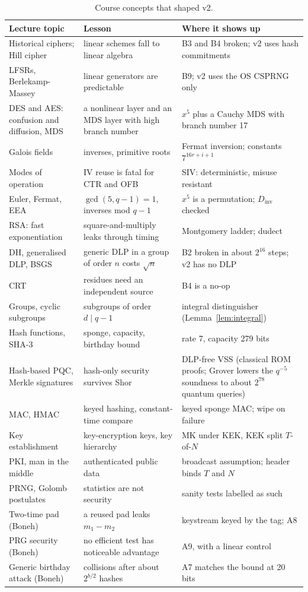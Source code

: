 \documentclass[10pt,a4paper]{article}
\theoremstyle{definition}
\theoremstyle{remark}
\begin{document}
\begin{table}[t]
\centering\small
\begin{tabularx}{\linewidth}{@{}l L L@{}}
\toprule
Lecture topic & Lesson & Where it shows up \\
\midrule
Historical ciphers; Hill cipher & linear schemes fall to linear algebra & B3 and B4 broken; v2 uses hash commitments \\
LFSRs, Berlekamp-Massey & linear generators are predictable & B9; v2 uses the OS CSPRNG only \\
DES and AES: confusion and diffusion, MDS & a nonlinear layer and an MDS layer with high branch number & $x^5$ plus a Cauchy MDS with branch number 17 \\
Galois fields & inverses, primitive roots & Fermat inversion; constants $7^{16r+i+1}$ \\
Modes of operation & IV reuse is fatal for CTR and OFB & SIV: deterministic, misuse resistant \\
Euler, Fermat, EEA & $\gcd(5, q-1) = 1$, inverses mod $q-1$ & $x^5$ is a permutation; $D_{\mathrm{inv}}$ checked \\
RSA: fast exponentiation & square-and-multiply leaks through timing & Montgomery ladder; dudect \\
DH, generalised DLP, BSGS & generic DLP in a group of order $n$ costs $\sqrt{n}$ & B2 broken in about $2^{16}$ steps; v2 has no DLP \\
CRT & residues need an independent source & B4 is a no-op \\
Groups, cyclic subgroups & subgroups of order $d \mid q-1$ & integral distinguisher (Lemma~\ref{lem:integral}) \\
Hash functions, SHA-3 & sponge, capacity, birthday bound & rate 7, capacity 279 bits \\
Hash-based PQC, Merkle signatures & hash-only security survives Shor & DLP-free VSS (classical ROM proofs; Grover lowers the $q^{-5}$ soundness to about $2^{78}$ quantum queries) \\
MAC, HMAC & keyed hashing, constant-time compare & keyed sponge MAC; wipe on failure \\
Key establishment & key-encryption keys, key hierarchy & MK under KEK, KEK split $T$-of-$N$ \\
PKI, man in the middle & authenticated public data & broadcast assumption; header binds $T$ and $N$ \\
PRNG, Golomb postulates & statistics are not security & sanity tests labelled as such \\
Two-time pad (Boneh) & a reused pad leaks $m_1 - m_2$ & keystream keyed by the tag; A8 \\
PRG security (Boneh) & no efficient test has noticeable advantage & A9, with a linear control \\
Generic birthday attack (Boneh) & collisions after about $2^{b/2}$ hashes & A7 matches the bound at 20 bits \\
\bottomrule
\end{tabularx}
\caption{Course concepts that shaped v2.}\label{tab:course}
\end{table}
\end{document}
